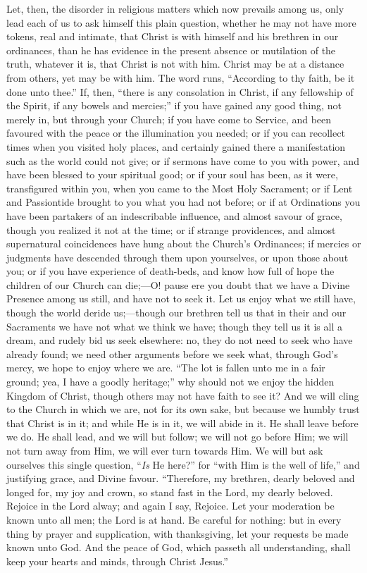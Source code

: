 Let, then, the disorder in religious matters which now prevails
among us, only lead each of us to ask himself this plain question,
whether he may not have more tokens, real and intimate, that Christ is
with himself and his brethren in our ordinances, than he has evidence
in the present absence or mutilation of the truth, whatever it is,
that Christ is not with him. Christ may be at a distance from others,
yet may be with him. The word runs, ``According to thy faith, be
it done unto thee.'' If, then, ``there is any consolation in
Christ, if any fellowship of the Spirit, if any bowels and
mercies;'' if you have gained any good thing, not merely in, but
through your Church; if you have come to Service, and been favoured
with the peace or the illumination you needed; or if you can recollect
times when you visited holy places, and certainly gained there a
manifestation such as the world could not give; or if sermons have
come to you with power, and have been blessed to your spiritual good;
or if your soul has been, as it were, transfigured within you, when
you came to the Most Holy Sacrament; or if Lent and Passiontide
brought to you what you had not before; or if at Ordinations you have
been partakers of an indescribable influence, and almost savour of
grace, though you realized it not at the time; or if strange
providences, and almost supernatural coincidences have hung about the
Church's Ordinances; if mercies or judgments have descended through
them upon yourselves, or upon those about you; or if you have
experience of death-beds, and know how full of hope the children of
our Church can die;—O! pause ere you doubt that we have a Divine
Presence among us still, and have not to seek it. Let us enjoy what we
still have, though the world deride us;—though our brethren tell us
that in their and our Sacraments we have not what we think we have;
though they tell us it is all a dream, and rudely bid us seek
elsewhere: no, they do not need to seek who have already found; we
need other arguments before we seek what, through God's mercy, we hope
to enjoy where we are. ``The lot is fallen unto me in a fair
ground; yea, I have a goodly heritage;'' why should not we enjoy
the hidden Kingdom of Christ, though others may not have faith to see
it? And we will cling to the Church in which we are, not for its own
sake, but because we humbly trust that Christ is in it; and while
He
is in it, we will abide in it. He shall leave before we do. He shall
lead, and we will but follow; we will not go before Him; we will not
turn away from Him, we will ever turn towards Him. We will but ask
ourselves this single question, ``\emph{Is} He here?'' for
``with Him is the well of life,'' and justifying grace, and
Divine favour. ``Therefore, my brethren, dearly beloved and longed
for, my joy and crown, so stand fast in the Lord, my dearly beloved.
Rejoice in the Lord alway; and again I say, Rejoice. Let your
moderation be known unto all men; the Lord is at hand. Be careful for
nothing: but in every thing by prayer and supplication, with
thanksgiving, let your requests be made known unto God. And the peace
of God, which passeth all understanding, shall keep your hearts and
minds, through Christ Jesus.''

